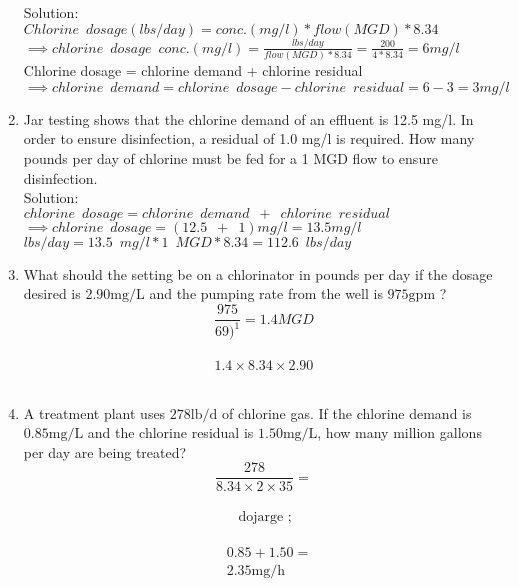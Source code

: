 \documentclass{article}
\begin{document}
\begin{enumerate}
\vspace{0.5cm}

Solution:\\
$Chlorine \enspace dosage (lbs/day)=conc. (mg/l)*flow(MGD)*8.34$\\
$\implies chlorine \enspace dosage \enspace conc. (mg/l)=\frac{lbs/day}{flow(MGD)*8.34}=\frac{200}{4*8.34}=6mg/l$\\
\vspace{0.5cm}
Chlorine dosage = chlorine demand + chlorine residual\\
$ \implies chlorine \enspace demand = chlorine \enspace dosage - chlorine \enspace residual=6-3=\boxed{3mg/l}$

\item Jar testing shows that the chlorine demand of an effluent is 12.5 mg/l. In order to ensure disinfection, a residual of 1.0 mg/l is required. How many pounds per day of chlorine must be fed for a 1 MGD flow to ensure disinfection.\\
\vspace{0.3cm}
Solution:\\
\vspace{0.3cm}
$ chlorine \enspace dosage = chlorine \enspace demand \enspace + \enspace chlorine \enspace residual$\\
$\implies chlorine \enspace dosage = (12.5 \enspace + \enspace 1 )mg/l=13.5 mg/l$\\
$lbs/day=13.5 \enspace mg/l*1 \enspace MGD*8.34=\boxed{112.6 \enspace lbs/day}$


\item What should the setting be on a chlorinator in pounds per day if the dosage desired is $2.90 \mathrm{mg} / \mathrm{L}$ and the pumping rate from the well is $975 \mathrm{gpm}$ ?\\
$$\frac{975}{69)^{1}}=1.4 MGD $$\\
$$1.4 \times 8.34 \times 2.90$$\\

\item A treatment plant uses $278 \mathrm{lb} / \mathrm{d}$ of chlorine gas. If the chlorine demand is $0.85 \mathrm{mg} / \mathrm{L}$ and the chlorine residual is $1.50 \mathrm{mg} / \mathrm{L}$, how many million gallons per day are being treated?\\
$$\frac{278}{8.34 \times 2 \times 35}=$$\\
$$\text { dojarge } ;$$\\
$$\begin{aligned}& 0.85+1.50= \\& 2.35 \mathrm{mg} / \mathrm{h}\end{aligned}$$\\


\end{enumerate}
\end{document}
